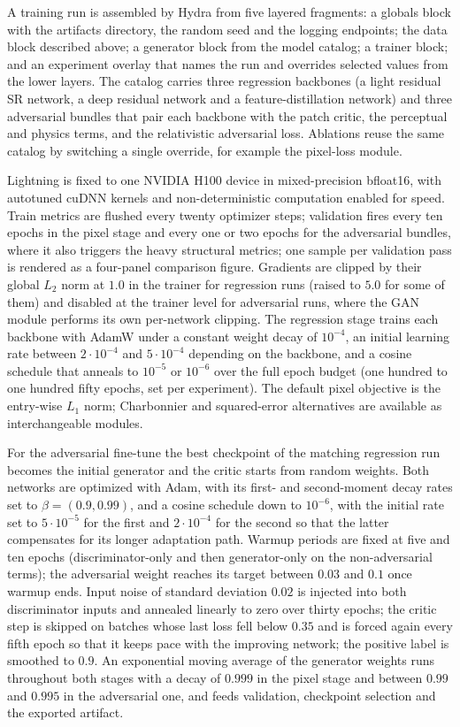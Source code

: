 A training run is assembled by Hydra from five layered fragments: a globals block with the artifacts directory, the random seed and the logging endpoints; the data block described above; a generator block from the model catalog; a trainer block; and an experiment overlay that names the run and overrides selected values from the lower layers. The catalog carries three regression backbones (a light residual SR network, a deep residual network and a feature-distillation network) and three adversarial bundles that pair each backbone with the patch critic, the perceptual and physics terms, and the relativistic adversarial loss. Ablations reuse the same catalog by switching a single override, for example the pixel-loss module.

Lightning is fixed to one NVIDIA H100 device in mixed-precision bfloat16, with autotuned cuDNN kernels and non-deterministic computation enabled for speed. Train metrics are flushed every twenty optimizer steps; validation fires every ten epochs in the pixel stage and every one or two epochs for the adversarial bundles, where it also triggers the heavy structural metrics; one sample per validation pass is rendered as a four-panel comparison figure. Gradients are clipped by their global $L_2$ norm at $1.0$ in the trainer for regression runs (raised to $5.0$ for some of them) and disabled at the trainer level for adversarial runs, where the GAN module performs its own per-network clipping. The regression stage trains each backbone with AdamW under a constant weight decay of $10^{-4}$, an initial learning rate between $2 \cdot 10^{-4}$ and $5 \cdot 10^{-4}$ depending on the backbone, and a cosine schedule that anneals to $10^{-5}$ or $10^{-6}$ over the full epoch budget (one hundred to one hundred fifty epochs, set per experiment). The default pixel objective is the entry-wise $L_1$ norm; Charbonnier and squared-error alternatives are available as interchangeable modules.

For the adversarial fine-tune the best checkpoint of the matching regression run becomes the initial generator and the critic starts from random weights. Both networks are optimized with Adam, with its first- and second-moment decay rates set to $\beta = (0.9, 0.99)$, and a cosine schedule down to $10^{-6}$, with the initial rate set to $5 \cdot 10^{-5}$ for the first and $2 \cdot 10^{-4}$ for the second so that the latter compensates for its longer adaptation path. Warmup periods are fixed at five and ten epochs (discriminator-only and then generator-only on the non-adversarial terms); the adversarial weight reaches its target between $0.03$ and $0.1$ once warmup ends. Input noise of standard deviation $0.02$ is injected into both discriminator inputs and annealed linearly to zero over thirty epochs; the critic step is skipped on batches whose last loss fell below $0.35$ and is forced again every fifth epoch so that it keeps pace with the improving network; the positive label is smoothed to $0.9$. An exponential moving average of the generator weights runs throughout both stages with a decay of $0.999$ in the pixel stage and between $0.99$ and $0.995$ in the adversarial one, and feeds validation, checkpoint selection and the exported artifact.

